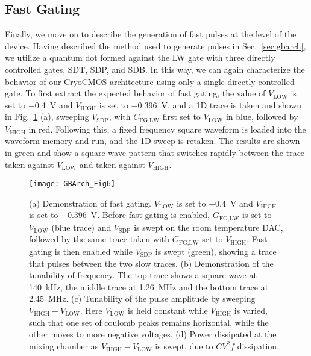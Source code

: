 \subsection{Fast Gating}
Finally, we move on to describe the generation of fast pulses at the level of the device. Having described the method used to generate pulses in Sec.~\ref{sec:gbarch}, we utilize a quantum dot formed against the LW gate with three directly controlled gates, SDT, SDP, and SDB. In this way, we can again characterize the behavior of our CryoCMOS architecture using only a single directly controlled gate. To first extract the expected behavior of fast gating, the value of $V_\textrm{LOW}$ is set to \SI{-0.4}{\volt} and $V_\textrm{HIGH}$ is set to \SI{-0.396}{\volt}, and a 1D trace is taken and shown in Fig.~\ref{fig:gbfg} (a), sweeping $V_\textrm{SDP}$, with $C_\textrm{FG,LW}$ first set to $V_\textrm{LOW}$ in blue, followed by $V_\textrm{HIGH}$ in red. Following this, a fixed frequency square waveform is loaded into the waveform memory and run, and the 1D sweep is retaken. The results are shown in green and show a square wave pattern that switches rapidly between the trace taken against $V_\textrm{LOW}$ and taken against $V_\textrm{HIGH}$.

\begin{figure}
  \texttt{[image: GBArch\_Fig6]}
  \caption[Characterization of fast gating]
  {\label{fig:gbfg} (a) Demonstration of fast gating. $V_\textrm{LOW}$ is set to \SI{-0.4}{\volt} and $V_\textrm{HIGH}$ is set to \SI{-0.396}{\volt}. Before fast gating is enabled, $G_\textrm{FG,LW}$ is set to $V_\textrm{LOW}$ (blue trace) and $V_\textrm{SDP}$ is swept on the room temperature DAC, followed by the same trace taken with $G_\textrm{FG,LW}$ set to $V_\textrm{HIGH}$. Fast gating is then enabled while $V_\textrm{SDP}$ is swept (green), showing a trace that pulses between the two slow traces. (b) Demonstration of the tunability of frequency. The top trace shows a square wave at \SI{140}{\kilo\hertz}, the middle trace at \SI{1.26}{\mega\hertz} and the bottom trace at \SI{2.45}{\mega\hertz}. (c) Tunability of the
  pulse amplitude by sweeping $V_\textrm{HIGH} - V_\textrm{LOW}$. Here $V_\textrm{LOW}$ is held constant while $V_\textrm{HIGH}$ is varied, such that one set of coulomb peaks remains
  horizontal, while the other moves to more negative voltages. (d) Power dissipated at the mixing chamber as $V_\textrm{HIGH} - V_\textrm{LOW}$ is swept, due to $CV^2f$ dissipation.}
\end{figure}

